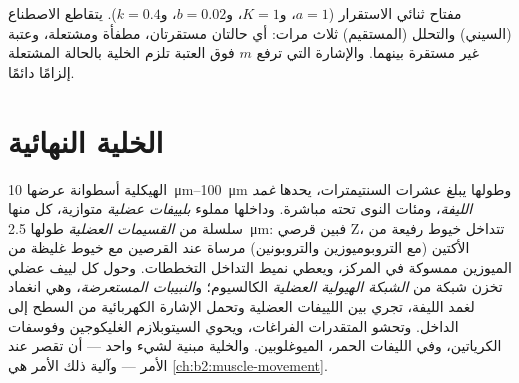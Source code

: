 \begin{omfigure}

{\small مفتاح ثنائي الاستقرار ($a = 1$، و$K = 1$، و$b = 0.02$، و$k = 0.4$).
يتقاطع الاصطناع (السيني) والتحلل (المستقيم) ثلاث مرات: أي
حالتان مستقرتان، مطفأة ومشتعلة، وعتبة غير مستقرة بينهما.
والإشارة التي ترفع $m$ فوق العتبة تلزم الخلية
بالحالة المشتعلة إلزامًا دائمًا.}
\end{omfigure}

\section{الخلية النهائية}

\begin{definition}\label{def:b2:cell-differentiation:fibre}
 الهيكلية أسطوانة عرضها \qtyrange{10}{100}{\micro m}
وطولها يبلغ عشرات السنتيمترات، يحدها
\emph{غمد الليفة}، ومئات النوى تحته مباشرة. وداخلها
مملوء \emph{بلييفات عضلية} متوازية، كل منها سلسلة من
\emph{القسيمات العضلية} طولها \qty{2.5}{\micro m}: فبين قرصي Z، تتداخل خيوط
رفيعة من الأكتين (مع التروبوميوزين والتروبونين) مرساة عند
القرصين مع خيوط غليظة من الميوزين ممسوكة في
المركز، ويعطي نميط التداخل التخططات. وحول كل
لييف عضلي تخزن شبكة من \emph{الشبكة الهيولية العضلية} الكالسيوم؛
و\emph{النبيبات المستعرضة}، وهي انغماد لغمد الليفة، تجري
بين اللييفات العضلية وتحمل الإشارة الكهربائية من
السطح إلى الداخل. وتحشو المتقدرات الفراغات، ويحوي
السيتوبلازم الغليكوجين وفوسفات الكرياتين، وفي الليفات الحمر،
الميوغلوبين. والخلية مبنية لشيء واحد --- أن تقصر عند الأمر
--- وآلية ذلك الأمر هي
\cref{ch:b2:muscle-movement}.
\end{definition}

